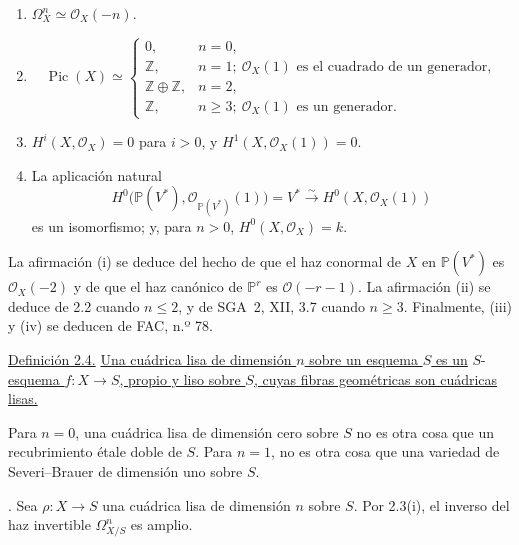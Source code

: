 \begin{enumerate}[label=(\roman*),leftmargin=2.6em]
\item $\Omega_X^n\simeq\mathcal O_X(-n)$.

\item
\begin{equation*}
\operatorname{Pic}(X)\simeq
\begin{cases}
0, & n=0,\\
\mathbb Z, & n=1;\ \mathcal O_X(1)\text{ es el cuadrado de un generador},\\
\mathbb Z\oplus\mathbb Z, & n=2,\\
\mathbb Z, & n\geq3;\ \mathcal O_X(1)\text{ es un generador}.
\end{cases}
\end{equation*}

\item $H^i(X,\mathcal O_X)=0$ para $i>0$, y
$H^1(X,\mathcal O_X(1))=0$.

\item La aplicación natural
\begin{equation*}
H^0\bigl(\mathbb P(V^*),\mathcal O_{\mathbb P(V^*)}(1)\bigr)
=V^*\xrightarrow{\sim}H^0(X,\mathcal O_X(1))
\end{equation*}
es un isomorfismo; y, para $n>0$, $H^0(X,\mathcal O_X)=k$.
\end{enumerate}

La afirmación (i) se deduce del hecho de que el haz conormal de $X$ en
$\mathbb P(V^*)$ es $\mathcal O_X(-2)$ y de que el haz canónico de
$\mathbb P^r$ es $\mathcal O(-r-1)$. La afirmación (ii) se deduce de 2.2
cuando $n\leq2$, y de SGA~2, XII, 3.7 cuando $n\geq3$. Finalmente, (iii)
y (iv) se deducen de FAC, n.º 78.

\medskip
\noindent\underline{Definición 2.4.}\quad
\underline{Una cuádrica lisa de dimensión $n$ sobre un esquema $S$ es un}
$S$-\underline{esquema $f:X\longrightarrow S$, propio y liso sobre $S$, cuyas fibras
geométricas son cuádricas lisas.}

Para $n=0$, una cuádrica lisa de dimensión cero sobre $S$ no es otra cosa
que un recubrimiento étale doble de $S$. Para $n=1$, no es otra cosa que
una variedad de Severi--Brauer de dimensión uno sobre $S$.

\medskip
{}. Sea $\rho:X\longrightarrow S$ una cuádrica lisa de
dimensión $n$ sobre $S$. Por 2.3(i), el inverso del haz invertible
$\Omega^n_{X/S}$ es amplio.

\pageoriginale


